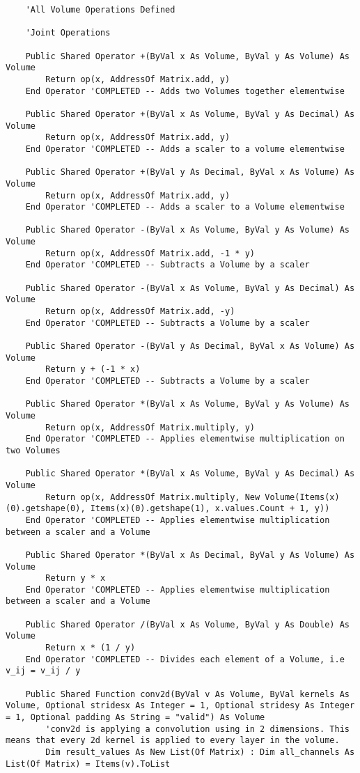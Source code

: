 \begin{verbatim}
    'All Volume Operations Defined

    'Joint Operations

    Public Shared Operator +(ByVal x As Volume, ByVal y As Volume) As Volume
        Return op(x, AddressOf Matrix.add, y)
    End Operator 'COMPLETED -- Adds two Volumes together elementwise

    Public Shared Operator +(ByVal x As Volume, ByVal y As Decimal) As Volume
        Return op(x, AddressOf Matrix.add, y)
    End Operator 'COMPLETED -- Adds a scaler to a volume elementwise

    Public Shared Operator +(ByVal y As Decimal, ByVal x As Volume) As Volume
        Return op(x, AddressOf Matrix.add, y)
    End Operator 'COMPLETED -- Adds a scaler to a Volume elementwise

    Public Shared Operator -(ByVal x As Volume, ByVal y As Volume) As Volume
        Return op(x, AddressOf Matrix.add, -1 * y)
    End Operator 'COMPLETED -- Subtracts a Volume by a scaler

    Public Shared Operator -(ByVal x As Volume, ByVal y As Decimal) As Volume
        Return op(x, AddressOf Matrix.add, -y)
    End Operator 'COMPLETED -- Subtracts a Volume by a scaler

    Public Shared Operator -(ByVal y As Decimal, ByVal x As Volume) As Volume
        Return y + (-1 * x)
    End Operator 'COMPLETED -- Subtracts a Volume by a scaler

    Public Shared Operator *(ByVal x As Volume, ByVal y As Volume) As Volume
        Return op(x, AddressOf Matrix.multiply, y)
    End Operator 'COMPLETED -- Applies elementwise multiplication on two Volumes 

    Public Shared Operator *(ByVal x As Volume, ByVal y As Decimal) As Volume
        Return op(x, AddressOf Matrix.multiply, New Volume(Items(x)(0).getshape(0), Items(x)(0).getshape(1), x.values.Count + 1, y))
    End Operator 'COMPLETED -- Applies elementwise multiplication between a scaler and a Volume

    Public Shared Operator *(ByVal x As Decimal, ByVal y As Volume) As Volume
        Return y * x
    End Operator 'COMPLETED -- Applies elementwise multiplication between a scaler and a Volume

    Public Shared Operator /(ByVal x As Volume, ByVal y As Double) As Volume
        Return x * (1 / y)
    End Operator 'COMPLETED -- Divides each element of a Volume, i.e v_ij = v_ij / y

    Public Shared Function conv2d(ByVal v As Volume, ByVal kernels As Volume, Optional stridesx As Integer = 1, Optional stridesy As Integer = 1, Optional padding As String = "valid") As Volume
        'conv2d is applying a convolution using in 2 dimensions. This means that every 2d kernel is applied to every layer in the volume.
        Dim result_values As New List(Of Matrix) : Dim all_channels As List(Of Matrix) = Items(v).ToList


\end{verbatim}
